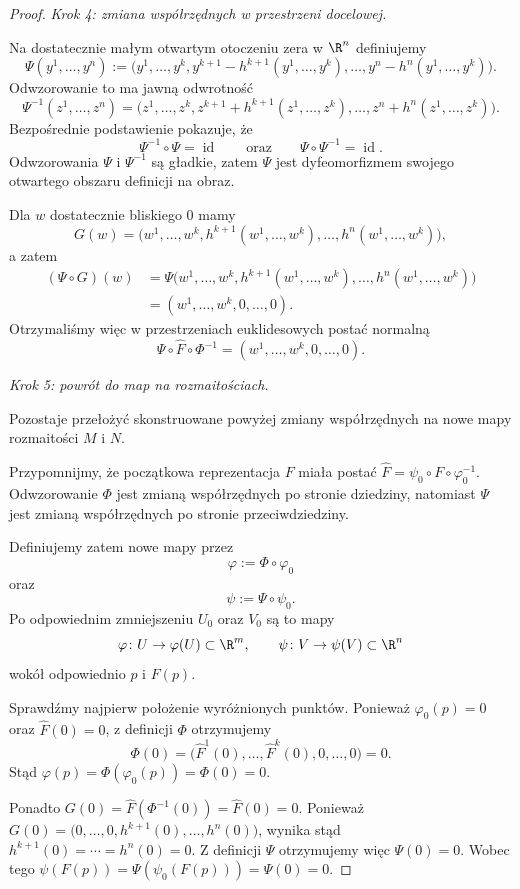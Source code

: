 \begin{proof}
\medskip
\emph{Krok 4: zmiana współrzędnych w przestrzeni docelowej.}

Na dostatecznie małym otwartym otoczeniu zera w $\R^n$
definiujemy
\[
\Psi(y^1,\dots,y^n)
:=
\bigl(
y^1,\dots,y^k,
y^{k+1}-h^{k+1}(y^1,\dots,y^k),
\dots,
y^n-h^n(y^1,\dots,y^k)
\bigr).
\]
Odwzorowanie to ma jawną odwrotność
\[
\Psi^{-1}(z^1,\dots,z^n)
=
\bigl(
z^1,\dots,z^k,
z^{k+1}+h^{k+1}(z^1,\dots,z^k),
\dots,
z^n+h^n(z^1,\dots,z^k)
\bigr).
\]
Bezpośrednie podstawienie pokazuje, że
\[
\Psi^{-1}\circ\Psi=\operatorname{id}
\qquad\text{oraz}\qquad
\Psi\circ\Psi^{-1}=\operatorname{id}.
\]
Odwzorowania $\Psi$ i $\Psi^{-1}$ są gładkie, zatem $\Psi$
jest dyfeomorfizmem swojego otwartego obszaru definicji na obraz.

Dla $w$ dostatecznie bliskiego $0$ mamy
\[
G(w) = \bigl( w^1,\dots,w^k, h^{k+1}(w^1,\dots,w^k), \dots, h^n(w^1,\dots,w^k) \bigr),
\]
a zatem
\begin{align*}
(\Psi\circ G)(w)
&=
\Psi\bigl(
w^1,\dots,w^k,
h^{k+1}(w^1,\dots,w^k),
\dots,
h^n(w^1,\dots,w^k)
\bigr)\\
&=
(w^1,\dots,w^k,0,\dots,0).
\end{align*}
Otrzymaliśmy więc w przestrzeniach euklidesowych postać normalną
\[
\Psi\circ\widehat F\circ\Phi^{-1}
= (w^1,\dots,w^k,0,\dots,0).
\]

\medskip
\emph{Krok 5: powrót do map na rozmaitościach.}

Pozostaje przełożyć skonstruowane powyżej zmiany współrzędnych
na nowe mapy rozmaitości $M$ i $N$.

Przypomnijmy, że początkowa reprezentacja $F$ miała postać $\widehat F = \psi_0\circ F\circ\varphi_0^{-1}$.
Odwzorowanie $\Phi$ jest zmianą współrzędnych po stronie dziedziny,
natomiast $\Psi$ jest zmianą współrzędnych po stronie przeciwdziedziny.

Definiujemy zatem nowe mapy przez
\[
\boxed{ \varphi:=\Phi\circ\varphi_0 }
\]
oraz
\[
\boxed{ \psi:=\Psi\circ\psi_0. }
\]
Po odpowiednim zmniejszeniu $U_0$ oraz $V_0$ są to mapy
\[
\varphi\colon U\to\varphi(U)\subset\R^m, \qquad \psi\colon V\to\psi(V)\subset\R^n
\]
wokół odpowiednio $p$ i $F(p)$.

Sprawdźmy najpierw położenie wyróżnionych punktów. Ponieważ $\varphi_0(p)=0$
oraz $\widehat F(0)=0$,
z definicji $\Phi$ otrzymujemy
\[
\Phi(0) = \bigl( \widehat F^1(0),\dots,\widehat F^k(0), 0,\dots,0 \bigr) = 0.
\]
Stąd $\varphi(p) = \Phi(\varphi_0(p)) = \Phi(0) = 0$.

Ponadto $G(0) = \widehat F(\Phi^{-1}(0)) = \widehat F(0) = 0$.
Ponieważ $G(0) = \bigl( 0,\dots,0, h^{k+1}(0),\dots,h^n(0) \bigr)$,
wynika stąd $h^{k+1}(0)=\cdots=h^n(0)=0$.
Z definicji $\Psi$ otrzymujemy więc $\Psi(0)=0$.
Wobec tego $\psi(F(p)) = \Psi(\psi_0(F(p))) = \Psi(0) = 0$.


\end{proof}
